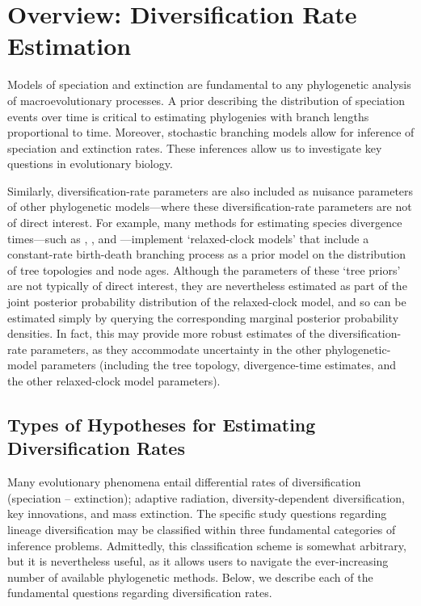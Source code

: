 \section{Overview: Diversification Rate Estimation}

Models of speciation and extinction are fundamental to any phylogenetic analysis of macroevolutionary processes.
A prior describing the distribution of speciation events over time is critical to estimating phylogenies with branch lengths proportional to time.
Moreover, stochastic branching models allow for inference of speciation and extinction rates.
These inferences allow us to investigate key questions in evolutionary biology.

Similarly, diversification-rate parameters are also included as nuisance parameters of other phylogenetic models---\IE where these diversification-rate parameters are not of direct interest.
For example, many methods for estimating species divergence times---such as \BEAST \citep{Drummond2012}, \MrBayes \citep{Ronquist2012}, and \RevBayes \citep{Hoehna2016b}---implement `relaxed-clock models' that include a constant-rate birth-death branching process as a prior model on the distribution of tree topologies and node ages.
Although the parameters of these `tree priors' are not typically of direct interest, they are nevertheless estimated as part of the joint posterior probability distribution of the relaxed-clock model, and so can be estimated simply by querying the corresponding marginal posterior probability densities.
In fact, this may provide more robust estimates of the diversification-rate parameters, as they accommodate uncertainty in the other phylogenetic-model parameters (including the tree topology, divergence-time estimates, and the other relaxed-clock model parameters).

\subsection{Types of Hypotheses for Estimating Diversification Rates}


Many evolutionary phenomena entail differential rates of diversification (speciation -- extinction); \EG adaptive radiation, diversity-dependent diversification, key innovations, and mass extinction.
The specific study questions regarding lineage diversification may be classified within three fundamental categories of inference problems.
Admittedly, this classification scheme is somewhat arbitrary, but it is nevertheless useful, as it allows users to navigate the ever-increasing number of available phylogenetic methods.
Below, we describe each of the fundamental questions regarding diversification rates.

